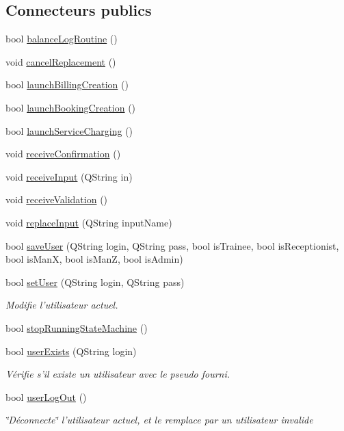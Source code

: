 \subsection*{Connecteurs publics}
\begin{DoxyCompactItemize}
\item 
bool \hyperlink{classSH__ApplicationCore_a008b4a797ce77f88df8c59226a151708}{balance\-Log\-Routine} ()
\item 
void \hyperlink{classSH__ApplicationCore_a9976ff6a371d6fe4c97cc37692584ff1}{cancel\-Replacement} ()
\item 
bool \hyperlink{classSH__ApplicationCore_a1e718a7a101e53e1cfcf8160104d4ba8}{launch\-Billing\-Creation} ()
\item 
bool \hyperlink{classSH__ApplicationCore_aa38f270d3c02be636c9acb2bd8c2bbbe}{launch\-Booking\-Creation} ()
\item 
bool \hyperlink{classSH__ApplicationCore_a74af071d9fefb1f0c3373e6501d04d62}{launch\-Service\-Charging} ()
\item 
void \hyperlink{classSH__ApplicationCore_a15cce25dbf982bc8fc391ddfb4d1fd24}{receive\-Confirmation} ()
\item 
void \hyperlink{classSH__ApplicationCore_a2191031eaee203587c1897791ddefbc4}{receive\-Input} (Q\-String in)
\item 
void \hyperlink{classSH__ApplicationCore_a6d40bb4cca2fe9e091dd369518d08ce0}{receive\-Validation} ()
\item 
void \hyperlink{classSH__ApplicationCore_a82123e26fba2d137cbf356b4aaf2078e}{replace\-Input} (Q\-String input\-Name)
\item 
bool \hyperlink{classSH__ApplicationCore_a30bb8d51f737740e33c2063bc30a0213}{save\-User} (Q\-String login, Q\-String pass, bool is\-Trainee, bool is\-Receptionist, bool is\-Man\-X, bool is\-Man\-Z, bool is\-Admin)
\item 
bool \hyperlink{classSH__ApplicationCore_a2dd5c029a2ea348f1dfd0a60dea476e4}{set\-User} (Q\-String login, Q\-String pass)
\begin{DoxyCompactList}\small\item\em Modifie l'utilisateur actuel. \end{DoxyCompactList}\item 
bool \hyperlink{classSH__ApplicationCore_a8015a273eaedf42926f20a7858933683}{stop\-Running\-State\-Machine} ()
\item 
bool \hyperlink{classSH__ApplicationCore_a63afe07c7ef380f8709854aba85fdb9e}{user\-Exists} (Q\-String login)
\begin{DoxyCompactList}\small\item\em Vérifie s'il existe un utilisateur avec le pseudo fourni. \end{DoxyCompactList}\item 
bool \hyperlink{classSH__ApplicationCore_a3603a68faa57edb8722f9d1b67767368}{user\-Log\-Out} ()
\begin{DoxyCompactList}\small\item\em \char`\"{}\-Déconnecte\char`\"{} l'utilisateur actuel, et le remplace par un utilisateur invalide \end{DoxyCompactList}\end{DoxyCompactItemize}
